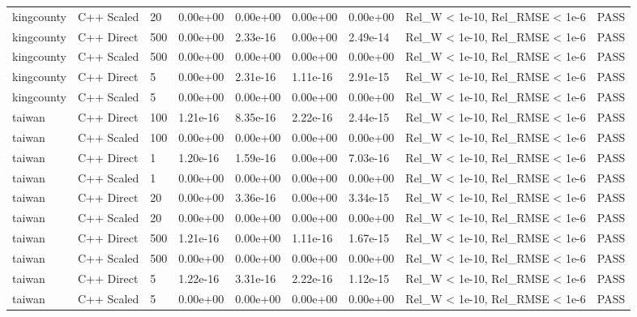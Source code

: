 \begin{table}[htbp]
\begin{tabular}{lllllllll}
kingcounty & C++ Scaled & 20 & 0.00e+00 & 0.00e+00 & 0.00e+00 & 0.00e+00 & Rel\_W < 1e-10, Rel\_RMSE < 1e-6 & PASS \\
kingcounty & C++ Direct & 500 & 0.00e+00 & 2.33e-16 & 0.00e+00 & 2.49e-14 & Rel\_W < 1e-10, Rel\_RMSE < 1e-6 & PASS \\
kingcounty & C++ Scaled & 500 & 0.00e+00 & 0.00e+00 & 0.00e+00 & 0.00e+00 & Rel\_W < 1e-10, Rel\_RMSE < 1e-6 & PASS \\
kingcounty & C++ Direct & 5 & 0.00e+00 & 2.31e-16 & 1.11e-16 & 2.91e-15 & Rel\_W < 1e-10, Rel\_RMSE < 1e-6 & PASS \\
kingcounty & C++ Scaled & 5 & 0.00e+00 & 0.00e+00 & 0.00e+00 & 0.00e+00 & Rel\_W < 1e-10, Rel\_RMSE < 1e-6 & PASS \\
taiwan & C++ Direct & 100 & 1.21e-16 & 8.35e-16 & 2.22e-16 & 2.44e-15 & Rel\_W < 1e-10, Rel\_RMSE < 1e-6 & PASS \\
taiwan & C++ Scaled & 100 & 0.00e+00 & 0.00e+00 & 0.00e+00 & 0.00e+00 & Rel\_W < 1e-10, Rel\_RMSE < 1e-6 & PASS \\
taiwan & C++ Direct & 1 & 1.20e-16 & 1.59e-16 & 0.00e+00 & 7.03e-16 & Rel\_W < 1e-10, Rel\_RMSE < 1e-6 & PASS \\
taiwan & C++ Scaled & 1 & 0.00e+00 & 0.00e+00 & 0.00e+00 & 0.00e+00 & Rel\_W < 1e-10, Rel\_RMSE < 1e-6 & PASS \\
taiwan & C++ Direct & 20 & 0.00e+00 & 3.36e-16 & 0.00e+00 & 3.34e-15 & Rel\_W < 1e-10, Rel\_RMSE < 1e-6 & PASS \\
taiwan & C++ Scaled & 20 & 0.00e+00 & 0.00e+00 & 0.00e+00 & 0.00e+00 & Rel\_W < 1e-10, Rel\_RMSE < 1e-6 & PASS \\
taiwan & C++ Direct & 500 & 1.21e-16 & 0.00e+00 & 1.11e-16 & 1.67e-15 & Rel\_W < 1e-10, Rel\_RMSE < 1e-6 & PASS \\
taiwan & C++ Scaled & 500 & 0.00e+00 & 0.00e+00 & 0.00e+00 & 0.00e+00 & Rel\_W < 1e-10, Rel\_RMSE < 1e-6 & PASS \\
taiwan & C++ Direct & 5 & 1.22e-16 & 3.31e-16 & 2.22e-16 & 1.12e-15 & Rel\_W < 1e-10, Rel\_RMSE < 1e-6 & PASS \\
taiwan & C++ Scaled & 5 & 0.00e+00 & 0.00e+00 & 0.00e+00 & 0.00e+00 & Rel\_W < 1e-10, Rel\_RMSE < 1e-6 & PASS \\
\bottomrule
\end{tabular}
\end{table}
